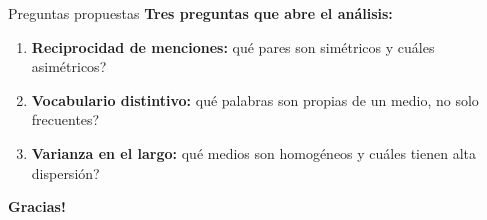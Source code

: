 \documentclass[10pt,aspectratio=169,table]{beamer}
\begin{document}
\begin{frame}{Preguntas propuestas}
  \textbf{Tres preguntas que abre el análisis:}
  \begin{enumerate}\small
    \item \textbf{Reciprocidad de menciones:} \textquestiondown{}qué pares son simétricos y cuáles asimétricos?
    \item \textbf{Vocabulario distintivo:} \textquestiondown{}qué palabras son propias de un medio, no solo frecuentes?
    \item \textbf{Varianza en el largo:} \textquestiondown{}qué medios son homogéneos y cuáles tienen alta dispersión?
  \end{enumerate}
\end{frame}

\begin{frame}
  \vfill
  \centering \Huge \textbf{\textexclamdown{}Gracias!}
  \vfill
\end{frame}
\end{document}
